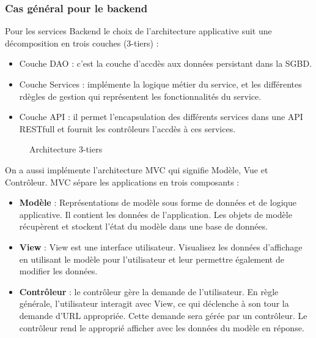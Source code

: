 \subsubsection{Cas g\'en\'eral pour le backend}
Pour les services Backend le choix de l'architecture applicative suit une d\'ecomposition en trois couches (3-tiers) :
\begin{itemize}
\item Couche DAO : c'est la couche d'accd\`es aux donn\'ees persistant dans la SGBD.
\item Couche Services : impl\'emente la logique m\'etier du service, et les diff\'erentes rd\`egles de gestion qui repr\'esentent les fonctionnalit\'es du service.
\item Couche API : il permet l'encapsulation des diff\'erents services dans une API RESTfull et fournit les contr\^oleurs l'accd\`es \`a ces services.
\end{itemize}

\begin{figure}[H]
	\caption{\label{fig:my-label} Architecture 3-tiers}
\end{figure}

On a aussi impl\'emente l'architecture \gls{MVC} qui signifie  Mod\`ele, Vue et Contr\^oleur. MVC s\'epare les applications en trois composants : 

\begin{itemize}
\item \textbf{Mod\`ele} : Repr\'esentations de mod\`ele sous forme de donn\'ees et de logique applicative. Il contient les donn\'ees de l'application. Les objets de mod\`ele r\'ecup\`erent et stockent l'\'etat du mod\`ele dans une base de donn\'ees.

\item \textbf{View} : View est une interface utilisateur. Visualisez les donn\'ees d'affichage en utilisant le mod\`ele pour l'utilisateur et leur permettre \'egalement de modifier les donn\'ees.

\item \textbf{Contr\^oleur} : le contr\^oleur g\`ere la demande de l'utilisateur. En r\`egle g\'en\'erale, l'utilisateur interagit avec View, ce qui d\'eclenche à son tour la demande d'URL appropri\'ee. Cette demande sera g\'er\'ee par un contr\^oleur. Le contr\^oleur rend le appropri\'e
afficher avec les donn\'ees du mod\`ele en r\'eponse.
\end{itemize}

